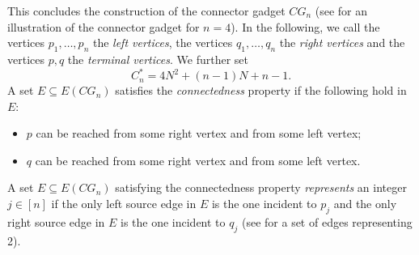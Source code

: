 \documentclass[a4paper,11pt]{article}
\theoremstyle{plain}
\newtheorem{identification rule}{Identification Rule}
\theoremstyle{definition}
\theoremstyle{remark}
\begin{document}
This concludes the construction of the connector gadget $CG_n$  (see  for an illustration of the connector gadget for $n = 4$). In the following, we call the vertices $p_1,\ldots,p_n$ the \emph{left vertices}, the vertices $q_1,\ldots,q_n$ the \emph{right vertices} and the vertices $p,q$ the \emph{terminal vertices}. We further set 
\[
C_n^* = 4N^2+(n-1)N+n-1.
\]
A set $E \subseteq E(CG_n)$ satisfies the \emph{connectedness} property if the following hold in $E$:
\begin{itemize}
\item $p$ can be reached from some right vertex and from some left vertex;
\item $q$ can be reached from some right vertex and from some left vertex.
\end{itemize}
A set $E \subseteq E(CG_n)$ satisfying the connectedness property \emph{represents} an integer $j \in [n]$ if the only left source edge in $E$ is the one incident to $p_j$ and the only right source edge in $E$ is the one incident to $q_j$ (see  for a set of edges representing 2).
\end{document}
